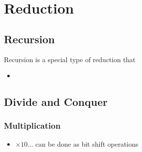 \chapter{Reduction}

\section{Recursion}

  Recursion is a special type of reduction that

  \begin{itemize}
    \item
  \end{itemize}

\section{Divide and Conquer}

  \subsection{Multiplication}

    \begin{itemize}
      \item $ \times 10... $ can be done as bit shift operations
    \end{itemize}
